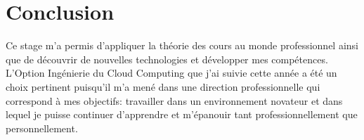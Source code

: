 \section{Conclusion}
Ce stage m'a permis d'appliquer la théorie des cours au monde professionnel ainsi que de découvrir de nouvelles technologies et développer mes compétences.
L'Option Ingénierie du Cloud Computing que j'ai suivie cette année a été un choix pertinent puisqu'il m'a mené dans une direction professionnelle qui correspond à mes objectifs: travailler dans un environnement novateur et dans lequel je puisse continuer d'apprendre et m'épanouir tant professionnellement que personnellement.

